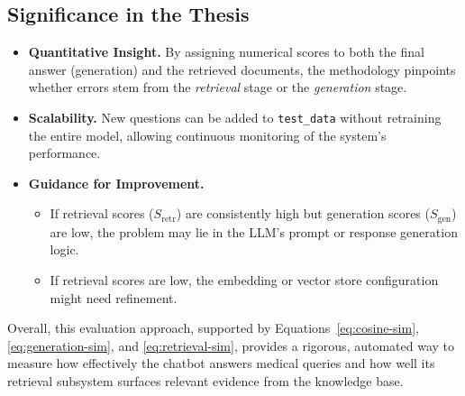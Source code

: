 \subsection{Significance in the Thesis}
\begin{itemize}
    \item \textbf{Quantitative Insight.} By assigning numerical scores to both the final answer (generation) and the retrieved documents, the methodology pinpoints whether errors stem from the \emph{retrieval} stage or the \emph{generation} stage.
    \item \textbf{Scalability.} New questions can be added to \texttt{test\_data} without retraining the entire model, allowing continuous monitoring of the system’s performance.
    \item \textbf{Guidance for Improvement.} 
    \begin{itemize}
        \item If retrieval scores ($S_\mathrm{retr}$) are consistently high but generation scores ($S_\mathrm{gen}$) are low, the problem may lie in the LLM’s prompt or response generation logic.
        \item If retrieval scores are low, the embedding or vector store configuration might need refinement.
    \end{itemize}
\end{itemize}

\noindent
Overall, this evaluation approach, supported by Equations~\ref{eq:cosine-sim}, \ref{eq:generation-sim}, and \ref{eq:retrieval-sim}, provides a rigorous, automated way to measure how effectively the chatbot answers medical queries and how well its retrieval subsystem surfaces relevant evidence from the knowledge base.
